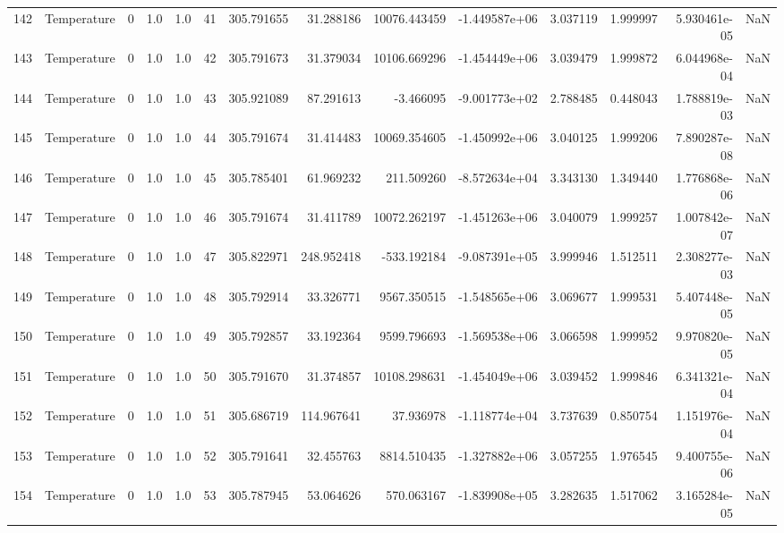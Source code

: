 \begin{tabular}{llrrrrrrrrrrrr}
142 &  Temperature &       0 &  1.0 &  1.0 &   41 &  305.791655 &    31.288186 &   10076.443459 & -1.449587e+06 &  3.037119 &  1.999997 &  5.930461e-05 &      NaN \\
143 &  Temperature &       0 &  1.0 &  1.0 &   42 &  305.791673 &    31.379034 &   10106.669296 & -1.454449e+06 &  3.039479 &  1.999872 &  6.044968e-04 &      NaN \\
144 &  Temperature &       0 &  1.0 &  1.0 &   43 &  305.921089 &    87.291613 &      -3.466095 & -9.001773e+02 &  2.788485 &  0.448043 &  1.788819e-03 &      NaN \\
145 &  Temperature &       0 &  1.0 &  1.0 &   44 &  305.791674 &    31.414483 &   10069.354605 & -1.450992e+06 &  3.040125 &  1.999206 &  7.890287e-08 &      NaN \\
146 &  Temperature &       0 &  1.0 &  1.0 &   45 &  305.785401 &    61.969232 &     211.509260 & -8.572634e+04 &  3.343130 &  1.349440 &  1.776868e-06 &      NaN \\
147 &  Temperature &       0 &  1.0 &  1.0 &   46 &  305.791674 &    31.411789 &   10072.262197 & -1.451263e+06 &  3.040079 &  1.999257 &  1.007842e-07 &      NaN \\
148 &  Temperature &       0 &  1.0 &  1.0 &   47 &  305.822971 &   248.952418 &    -533.192184 & -9.087391e+05 &  3.999946 &  1.512511 &  2.308277e-03 &      NaN \\
149 &  Temperature &       0 &  1.0 &  1.0 &   48 &  305.792914 &    33.326771 &    9567.350515 & -1.548565e+06 &  3.069677 &  1.999531 &  5.407448e-05 &      NaN \\
150 &  Temperature &       0 &  1.0 &  1.0 &   49 &  305.792857 &    33.192364 &    9599.796693 & -1.569538e+06 &  3.066598 &  1.999952 &  9.970820e-05 &      NaN \\
151 &  Temperature &       0 &  1.0 &  1.0 &   50 &  305.791670 &    31.374857 &   10108.298631 & -1.454049e+06 &  3.039452 &  1.999846 &  6.341321e-04 &      NaN \\
152 &  Temperature &       0 &  1.0 &  1.0 &   51 &  305.686719 &   114.967641 &      37.936978 & -1.118774e+04 &  3.737639 &  0.850754 &  1.151976e-04 &      NaN \\
153 &  Temperature &       0 &  1.0 &  1.0 &   52 &  305.791641 &    32.455763 &    8814.510435 & -1.327882e+06 &  3.057255 &  1.976545 &  9.400755e-06 &      NaN \\
154 &  Temperature &       0 &  1.0 &  1.0 &   53 &  305.787945 &    53.064626 &     570.063167 & -1.839908e+05 &  3.282635 &  1.517062 &  3.165284e-05 &      NaN \\

\end{tabular}
